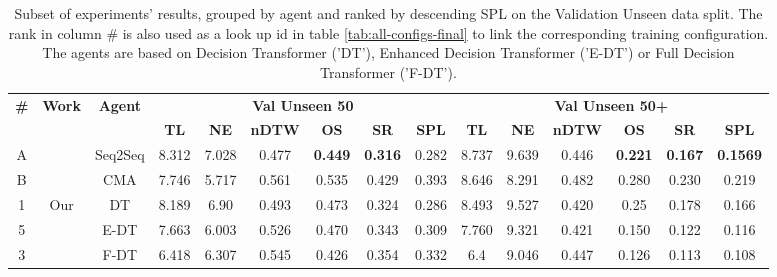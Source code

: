 \begin{table}
\centering
\caption{\label{tab:best_unseen_50}Subset of experiments' results, grouped by agent and ranked by descending SPL on the Validation Unseen data split. The rank in column \# is also used as a look up id in table \ref{tab:all-configs-final} to link the corresponding training configuration.     \newline The agents are based on Decision Transformer ('DT'), Enhanced Decision Transformer ('E-DT') or Full Decision Transformer ('F-DT').}
\begin{tabular}{@{\hskip3pt}c@{\hskip3pt}c@{\hskip3pt}c@{\hskip3pt}c@{\hskip3pt}c@{\hskip3pt}c@{\hskip3pt}c@{\hskip3pt}c@{\hskip3pt}c@{\hskip3pt}c@{\hskip3pt}c@{\hskip3pt}c@{\hskip3pt}c@{\hskip3pt}c@{\hskip3pt}c}
\toprule
\textbf{\#} & \textbf{Work} & \textbf{Agent} & \multicolumn{6}{c}{\textbf{Val Unseen 50}} & \multicolumn{6}{c}{\textbf{Val Unseen 50+}} \\
 \textbf{~} &     \textbf{~} &                \textbf{~} &       \textbf{TL} &    \textbf{NE} &   \textbf{nDTW} &     \textbf{OS} &    \textbf{SR} &    \textbf{SPL} &         \textbf{TL} &     \textbf{NE} &   \textbf{nDTW} &     \textbf{OS} &    \textbf{SR} &    \textbf{SPL} \\
\midrule
          A &             \citet{VLNCE} &                  Seq2Seq &             8.312 &          7.028 &           0.477 &  \textbf{0.449} &  \textbf{0.316} &           0.282 &                8.737 &           9.639 &           0.446 &  \textbf{0.221} &  \textbf{0.167} &  \textbf{0.1569} \\
          B &           &  CMA &             7.746 &          5.717 &           0.561 &           0.535 &          0.429 &           0.393 &               8.646 &           8.291 &           0.482 &           0.280 &          0.230 &           0.219 \\
\midrule
          1 &             Our &                  DT &             8.189 &          6.90 &           0.493 &  0.473 &  0.324 &           0.286 &                8.493 &           9.527 &          0.420 &  0.25 &  0.178 &  0.166 \\
          5 &            &  E-DT &             7.663 &          6.003 &           0.526 &           0.470 &          0.343 &           0.309 &               7.760 &           9.321 &           0.421 &           0.150 &          0.122 &           0.116 \\
          3 &            &  F-DT &              6.418 &  6.307 &  0.545 &           0.426 &          0.354 &  0.332 &                 6.4 &  9.046 &  0.447 &           0.126 &          0.113 &           0.108 \\
\bottomrule
\end{tabular}
\end{table}
